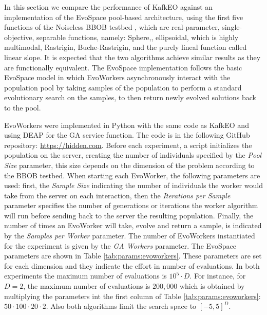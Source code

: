 \documentclass{llncs}
\begin{document}
  In this section we compare the performance of KafkEO against an implementation of
  the EvoSpace \cite{GValdez2015} pool-based architecture, using the first five
  functions of the Noiseless BBOB testbed \cite{hansen2016coco}, 
  which are real-parameter, single-objective, separable functions, namely: Sphere,,  ellipsoidal, which is highly multimodal,  Rastrigin,  Buche-Rastrigin,  and the purely lineal function called linear  slope. It is expected that the two algorithms achieve similar results as
  they are functionally equivalent. The EvoSpace implementation follows the
  basic EvoSpace model in which EvoWorkers asynchronously interact with the
  population pool by taking samples of the population to perform a standard
  evolutionary search on the samples, to then return newly evolved solutions back
  to the pool.

  EvoWorkers were implemented in Python with the same code as KafkEO and using
  DEAP \cite{fortin2012deap} for the GA service function. The code is in the
  following GitHub repository: \url{https://hidden.com}. Before each
  experiment, a script initializes the population on the server, creating the
  number of individuals specified by the {\em Pool Size} parameter, this
  size depends on the dimension of the problem according to the BBOB testbed.
  When starting each EvoWorker, the following parameters are used: first, the
  {\em Sample Size} indicating the number of individuals the worker would take
  from the server on each interaction, then the {\em Iterations per Sample}
  parameter specifies the number of generations or iterations the worker algorithm
  will run before sending back to the server the resulting population. Finally,
  the number of times an  EvoWorker will take, evolve and return a sample, is
  indicated by the {\em Samples per Worker} parameter.
   The number of EvoWorkers instantiated for the experiment 
   is given by the {\em GA Workers} parameter.  The EvoSpace parameters
  are shown in Table \ref{tab:params:evoworkers}.
   These parameters are set for
  each dimension and they indicate the effort in number of evaluations. In both
   experiments the maximum number of evaluations is $10^5 \cdot D$. For instance,
   for $D = 2$, the maximum number of evaluations is $200,000$ which is 
   obtained by multiplying
    the parameters int the first column of Table \ref{tab:params:evoworkers}: $50 \cdot 100 \cdot 20 \cdot 2$. Also both algorithms limit the search space to $[-5,5]^D$.
\end{document}
